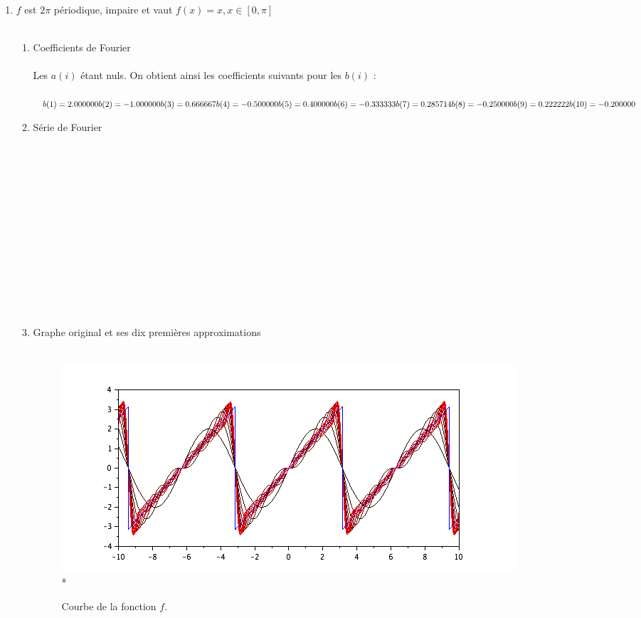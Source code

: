 \documentclass[a4paper,12pt]{report}
\begin{document}
\begin{enumerate}
		\item $f$ est $2\pi$ périodique, impaire et vaut $f(x)=x, x \in [0,\pi]$ \\ \\
		\begin{enumerate}
			\item Coefficients de Fourier \\ \\
			Les $a(i)$ étant nuls. On obtient ainsi les coefficients suivants pour les $b(i)$ : \\ \\
			$b(1) = 2.000000\\
			b(2) = -1.000000\\
			b(3) = 0.666667\\
			b(4) 	= -0.500000\\
			b(5) = 0.400000\\
			b(6) = -0.333333\\
			b(7) = 0.285714\\
			b(8) = -0.250000\\
			b(9) = 0.222222\\
			b(10) = -0.200000$\\
			\item Série de Fourier \\ \\ \\ \\ \\ \\ \\ \\ \\ \\ \\ \\ \\ \\

			\item Graphe original et ses dix premières approximations \\ \\
			\begin{figure}[h!]
				\centering
				\includegraphics[scale=0.6]{ex1_fig2_1.png}\\*
				\caption{\label{ex1_figure2_1}Courbe de la fonction $f$.}
			\end{figure}\\
		

\end{enumerate}
\end{enumerate}
\end{document}
